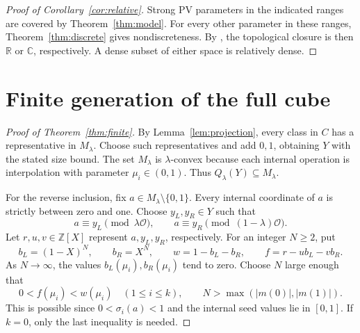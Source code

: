\documentclass[11pt]{article}
\theoremstyle{remark}
\newcommand{\Z}{\mathbb Z}
\newcommand{\R}{\mathbb R}
\newcommand{\C}{\mathbb C}
\newcommand{\Oa}{\mathcal O}
\begin{document}
\begin{proof}[Proof of Corollary~\ref{cor:relative}]
Strong PV parameters in the indicated ranges are covered by Theorem~\ref{thm:model}. For every other parameter in these ranges, Theorem~\ref{thm:discrete} gives nondiscreteness. By \cite[Corollary~3.5 and Theorem~2.19]{FGH2020}, the topological closure is then $\R$ or $\C$, respectively. A dense subset of either space is relatively dense.
\end{proof}

\section{Finite generation of the full cube}
\begin{proof}[Proof of Theorem~\ref{thm:finite}]
By Lemma~\ref{lem:projection}, every class in $C$ has a representative in $M_\lambda$. Choose such representatives and add $0,1$, obtaining $Y$ with the stated size bound. The set $M_\lambda$ is $\lambda$-convex because each internal operation is interpolation with parameter $\mu_i\in(0,1)$. Thus $Q_\lambda(Y)\subseteq M_\lambda$.

For the reverse inclusion, fix $a\in M_\lambda\setminus\{0,1\}$. Every internal coordinate of $a$ is strictly between zero and one. Choose $y_L,y_R\in Y$ such that
\[
 a\equiv y_L\pmod{\lambda\Oa},\qquad
 a\equiv y_R\pmod{(1-\lambda)\Oa}.
\]
Let $r,u,v\in\Z[X]$ represent $a,y_L,y_R$, respectively. For an integer $N\ge2$, put
\[
 b_L=(1-X)^N,\qquad b_R=X^N,\qquad
 w=1-b_L-b_R,\qquad f=r-u b_L-v b_R.
\]
As $N\to\infty$, the values $b_L(\mu_i),b_R(\mu_i)$ tend to zero. Choose $N$ large enough that
\begin{equation}\label{eq:finiteconditions}
 0<f(\mu_i)<w(\mu_i)\quad(1\le i\le k),\qquad
 N>\max(|m(0)|,|m(1)|).
\end{equation}
This is possible since $0<\sigma_i(a)<1$ and the internal seed values lie in $[0,1]$. If $k=0$, only the last inequality is needed.


\end{proof}
\end{document}
